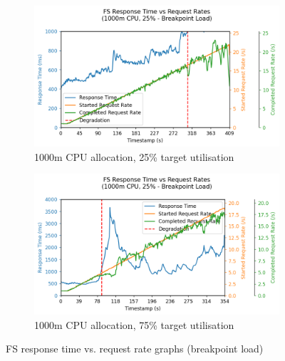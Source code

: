 \begin{figure}[h]
    \centering
    \begin{subfigure}{.5\textwidth}
      \centering
      \includegraphics[width=\linewidth]{figures/fs-rau-i5-response-curve-breakpoint.png}
      \caption{1000m CPU allocation, 25\% target utilisation}
    \end{subfigure}%
    \begin{subfigure}{.5\textwidth}
      \centering
      \includegraphics[width=\linewidth]{figures/fs-rau-i7-response-curve-breakpoint.png}
      \caption{1000m CPU allocation, 75\% target utilisation}
    \end{subfigure}

    \caption{FS response time vs. request rate graphs (breakpoint load)}
    \label{figure:fs-resource-allocation-rt-graph-i5-i7-breakpoint}
\end{figure}

